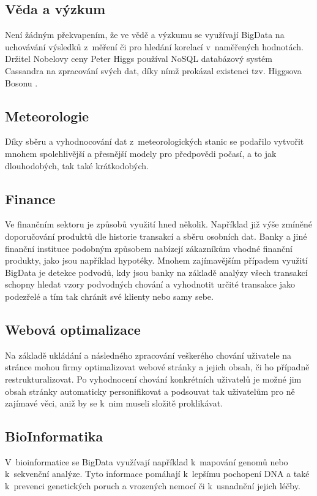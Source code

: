 \subsection{Věda a výzkum}

Není žádným překvapením, že ve vědě a výzkumu se využívají BigData na uchovávání výsledků z~měření či pro hledání korelací v~naměřených hodnotách. Držitel Nobelovy ceny Peter Higgs používal NoSQL databázový systém Cassandra na zpracování svých dat, díky nímž prokázal existenci tzv. Higgsova Bosonu \cite{higgs}.

\subsection{Meteorologie}
Díky sběru a vyhodnocování dat z~meteorologických stanic se podařilo vytvořit mnohem spolehlivější a přesnější modely pro předpovědi počasí, a to jak dlouhodobých, tak také krátkodobých. 

\subsection{Finance}
Ve finančním sektoru je způsobů využití hned několik. Například již výše zmíněné doporučování produktů dle historie transakcí a sběru  osobních dat. Banky a jiné finanční instituce podobným způsobem nabízejí zákazníkům vhodné finanční produkty, jako jsou například hypotéky. Mnohem zajímavějším případem využití BigData je detekce podvodů, kdy jsou banky na základě analýzy všech transakcí schopny hledat vzory podvodných chování a vyhodnotit určité transakce jako podezřelé a tím tak chránit své klienty nebo samy sebe.

\subsection{Webová optimalizace}
Na základě ukládání a následného zpracování veškerého chování uživatele na stránce mohou firmy optimalizovat webové stránky a jejich obsah, či ho případně restrukturalizovat. Po vyhodnocení chování konkrétních uživatelů je možné jim obsah stránky automaticky personifikovat a podsouvat tak uživatelům pro ně zajímavé věci, aniž by se k~nim museli složitě proklikávat.

\subsection{BioInformatika}
V~bioinformatice se BigData využívají například k~mapování genomů nebo k~sekvenční analýze. Tyto informace pomáhají k~lepšímu pochopení DNA a také k~prevenci genetických poruch a vrozených nemocí či k~usnadnění jejich léčby. \cite{industries} 

